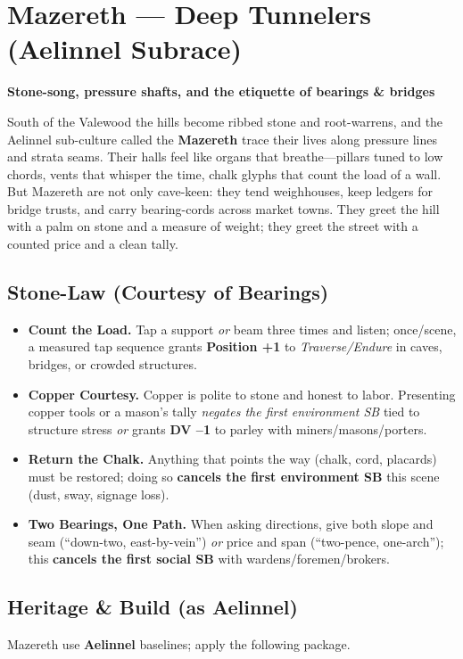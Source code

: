 \documentclass[11pt,letterpaper]{article}
\begin{document}
\section{Mazereth --- Deep Tunnelers (Aelinnel Subrace)}

\textbf{Stone-song, pressure shafts, and the etiquette of bearings \& bridges}

South of the Valewood the hills become ribbed stone and root-warrens, and the Aelinnel sub-culture called the \textbf{Mazereth} trace their lives along pressure lines and strata seams. Their halls feel like organs that breathe---pillars tuned to low chords, vents that whisper the time, chalk glyphs that count the load of a wall. But Mazereth are not only cave-keen: they tend weighhouses, keep ledgers for bridge trusts, and carry bearing-cords across market towns. They greet the hill with a palm on stone and a measure of weight; they greet the street with a counted price and a clean tally.

\subsection*{Stone-Law (Courtesy of Bearings)}
\begin{itemize}
\item \textbf{Count the Load.} Tap a support \emph{or} beam three times and listen; once/scene, a measured tap sequence grants \textbf{Position +1} to \emph{Traverse/Endure} in caves, bridges, or crowded structures.
\item \textbf{Copper Courtesy.} Copper is polite to stone and honest to labor. Presenting copper tools or a mason's tally \emph{negates the first environment SB} tied to structure stress \emph{or} grants \textbf{DV --1} to parley with miners/masons/porters.
\item \textbf{Return the Chalk.} Anything that points the way (chalk, cord, placards) must be restored; doing so \textbf{cancels the first environment SB} this scene (dust, sway, signage loss).
\item \textbf{Two Bearings, One Path.} When asking directions, give both slope and seam (``down-two, east-by-vein'') \emph{or} price and span (``two-pence, one-arch''); this \textbf{cancels the first social SB} with wardens/foremen/brokers.
\end{itemize}

\subsection*{Heritage \& Build (as Aelinnel)}
Mazereth use \textbf{Aelinnel} baselines; apply the following package.
\end{document}
